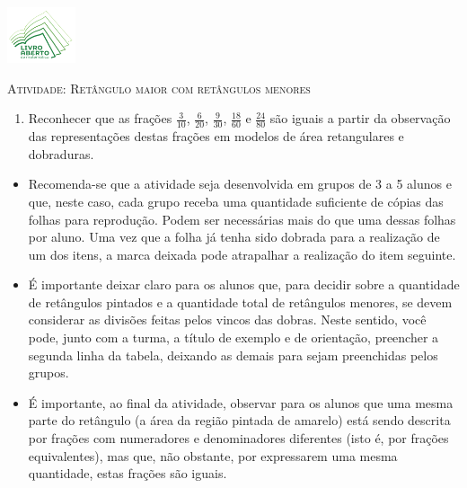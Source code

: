 \documentclass[10 pt,usenames,dvipsnames, oneside]{article}
\begin{document}
\begin{center}
  \begin{minipage}[l]{3cm}
\includegraphics[width=2cm]{../../../Figuras/logo}       
\end{minipage}\hfill
\begin{minipage}[r]{.8\textwidth}
 {\Large \scshape Atividade: Retângulo maior com retângulos menores}  
\end{minipage}
\end{center}
\vspace{.2cm}

\ifdefined\prof
\begin{goals}
\begin{enumerate}
\item       Reconhecer que as frações       $\frac{3}{10}$,
$\frac{6}{20}$, $\frac{9}{30}$, $\frac{18}{60}$ e $\frac{24}{80}$ são
iguais a partir da observação das representações destas frações em modelos de
área retangulares e dobraduras.
\end{enumerate}

\tcblower

\begin{itemize}
\item       Recomenda-se que a atividade seja desenvolvida em grupos de 3 a
5 alunos e que, neste caso, cada grupo receba uma quantidade suficiente de
cópias das             folhas para reprodução. Podem ser necessárias mais
do que uma dessas folhas por aluno. Uma vez que a folha já tenha sido dobrada
para a realização de um dos itens, a marca deixada pode atrapalhar a realização
do item seguinte.
\item       É importante deixar claro para os alunos que, para decidir sobre
a quantidade de retângulos pintados e a quantidade total de retângulos menores, se devem considerar as divisões feitas pelos vincos das dobras. Neste sentido, você pode,
junto com a turma, a título de exemplo e de orientação, preencher a segunda
linha da tabela, deixando as demais para sejam preenchidas pelos grupos.
\item       É importante, ao final da atividade, observar para os alunos que
uma mesma parte do retângulo (a área da região pintada de amarelo) está sendo
descrita por frações com numeradores e denominadores diferentes (isto é, por
frações equivalentes), mas que, não obstante, por expressarem uma mesma
quantidade, estas frações são iguais.
\end{itemize}
\end{goals}
\end{document}
